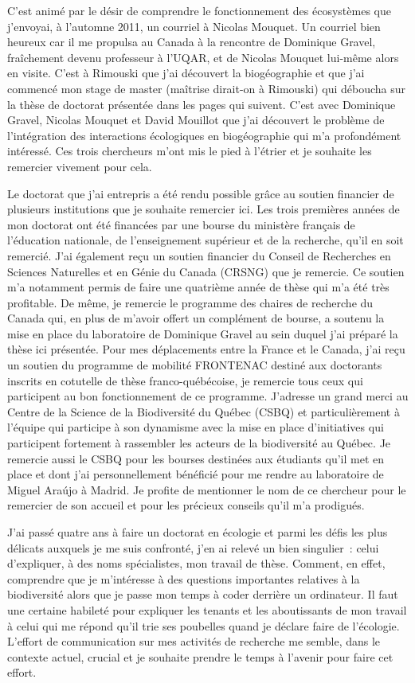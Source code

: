 C'est animé par le désir de comprendre le fonctionnement des écosystèmes
que j'envoyai, à l'automne 2011, un courriel à Nicolas Mouquet. Un
courriel bien heureux car il me propulsa au Canada à la rencontre de
Dominique Gravel, fraîchement devenu professeur à l'UQAR, et de Nicolas
Mouquet lui-même alors en visite. C'est à Rimouski que j'ai découvert la
biogéographie et que j'ai commencé mon stage de master (maîtrise
dirait-on à Rimouski) qui déboucha sur la thèse de doctorat présentée
dans les pages qui suivent. C'est avec Dominique Gravel, Nicolas Mouquet
et David Mouillot que j'ai découvert le problème de l'intégration des
interactions écologiques en biogéographie qui m'a profondément
intéressé. Ces trois chercheurs m'ont mis le pied à l'étrier et je
souhaite les remercier vivement pour cela.

Le doctorat que j'ai entrepris a été rendu possible grâce au soutien
financier de plusieurs institutions que je souhaite remercier ici. Les
trois premières années de mon doctorat ont été financées par une bourse
du ministère français de l'éducation nationale, de l'enseignement
supérieur et de la recherche, qu'il en soit remercié. J'ai également
reçu un soutien financier du Conseil de Recherches en Sciences
Naturelles et en Génie du Canada (CRSNG) que je remercie. Ce soutien m'a
notamment permis de faire une quatrième année de thèse qui m'a été très
profitable. De même, je remercie le programme des chaires de recherche
du Canada qui, en plus de m'avoir offert un complément de bourse, a
soutenu la mise en place du laboratoire de Dominique Gravel au sein
duquel j'ai préparé la thèse ici présentée. Pour mes déplacements entre
la France et le Canada, j'ai reçu un soutien du programme de mobilité
FRONTENAC destiné aux doctorants inscrits en cotutelle de thèse
franco-québécoise, je remercie tous ceux qui participent au bon
fonctionnement de ce programme. J'adresse un grand merci au Centre de la
Science de la Biodiversité du Québec (CSBQ) et particulièrement à
l'équipe qui participe à son dynamisme avec la mise en place
d'initiatives qui participent fortement à rassembler les acteurs de la
biodiversité au Québec. Je remercie aussi le CSBQ pour les bourses
destinées aux étudiants qu'il met en place et dont j'ai personnellement
bénéficié pour me rendre au laboratoire de Miguel Araújo à Madrid. Je
profite de mentionner le nom de ce chercheur pour le remercier de son
accueil et pour les précieux conseils qu'il m'a prodigués.

J'ai passé quatre ans à faire un doctorat en écologie et parmi les défis
les plus délicats auxquels je me suis confronté, j'en ai relevé un bien
singulier~: celui d'expliquer, à des noms spécialistes, mon travail de
thèse. Comment, en effet, comprendre que je m'intéresse à des questions
importantes relatives à la biodiversité alors que je passe mon temps à
coder derrière un ordinateur. Il faut une certaine habileté pour
expliquer les tenants et les aboutissants de mon travail à celui qui me
répond qu'il trie ses poubelles quand je déclare faire de l'écologie.
L'effort de communication sur mes activités de recherche me semble, dans
le contexte actuel, crucial et je souhaite prendre le temps à l'avenir
pour faire cet effort.

